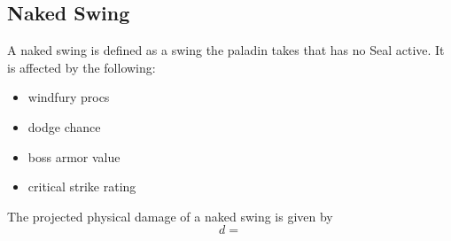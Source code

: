 \documentclass[letterpaper,11pt]{article}
\begin{document}
	
%	
%	
%	
%

	
	\subsection{Naked Swing}
	A naked swing is defined as a swing the paladin takes that has no Seal active.
	It is affected by the following:
	\begin{itemize}
		\item windfury procs
		\item dodge chance
		\item boss armor value
		\item critical strike rating
	\end{itemize}
	The projected physical damage of a naked swing is given by
	\begin{equation}
		d = 
	\end{equation}
	




	\appendix
	
\end{document}
